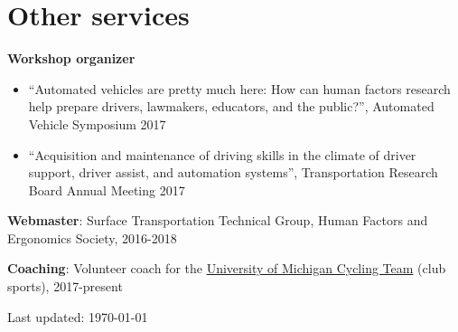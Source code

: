 \documentclass[11pt]{article}
\newenvironment{main}
{\begin{adjustwidth}{3em}{}}
{\end{adjustwidth}}
\begin{document}
\section*{Other services}
\begin{main}

\textbf{Workshop organizer}
\begin{itemize}
    \item “Automated vehicles are pretty much here: How can human factors research help prepare drivers, lawmakers, educators, and the public?”, Automated Vehicle Symposium 2017
    \item “Acquisition and maintenance of driving skills in the climate of driver support, driver assist, and automation systems”, Transportation Research Board Annual Meeting 2017
\end{itemize}

\textbf{Webmaster}: Surface Transportation Technical Group, Human Factors and Ergonomics Society, 2016-2018

\textbf{Coaching}: Volunteer coach for the \href{https://www.umcycling.org/}{University of Michigan Cycling Team} (club sports), 2017-present

\vfill\hfill
Last updated: \today

\end{main}
\end{document}
